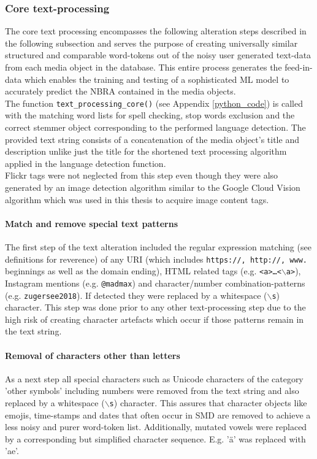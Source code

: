 \subsubsection{Core text-processing} \label{core_text_processing}
The core text processing encompasses the following alteration steps described in the following subsection and serves the purpose of creating universally similar structured and comparable word-tokens out of the noisy user generated text-data from each media object in the database. This entire process generates the feed-in-data which enables the training and testing of a sophisticated ML model to accurately predict the NBRA contained in the media objects.\\
The function \texttt{text\_processing\_core()} (see Appendix \ref{python_code}) is called with the matching word lists for spell checking, stop words exclusion and the correct stemmer object corresponding to the performed language detection. The provided text string consists of a concatenation of the media object's title and description unlike just the title for the shortened text processing algorithm applied in the language detection function.\\
Flickr tags were not neglected from this step even though they were also generated by an image detection algorithm similar to the Google Cloud Vision algorithm which was used in this thesis to acquire image content tags.

\paragraph*{Match and remove special text patterns} \label{text_patterns}
The first step of the text alteration included the regular expression matching (see definitions for reverence) of any URI (which includes \texttt{https://, http://, www.} beginnings as well as the domain ending), HTML related tags (e.g. \texttt{<a>\dots<$\backslash$a>}), Instagram mentions (e.g. \texttt{@madmax}) and character/number combination-patterns (e.g. \texttt{zugersee2018}). If detected they were replaced by a whitespace (\texttt{$\backslash$s}) character. This step was done prior to any other text-processing step due to the high risk of creating character artefacts which occur if those patterns remain in the text string.

\paragraph*{Removal of characters other than letters} \label{remove_eveything_but_letters}
As a next step all special characters such as Unicode characters of the category 'other symbols' including numbers were removed from the text string and also replaced by a whitespace (\texttt{$\backslash$s}) character. This assures that character objects like emojis, time-stamps and dates that often occur in SMD are removed to achieve a less noisy and purer word-token list. Additionally, mutated vowels were replaced by a corresponding but simplified character sequence. E.g. '\"a' was replaced with 'ae'.

